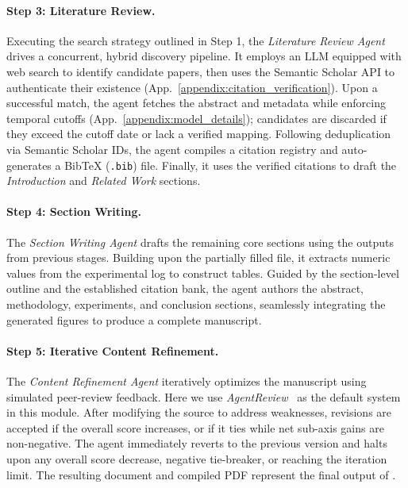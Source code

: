 \paragraph{Step 3: Literature Review.} Executing the search strategy outlined in Step 1, the \textit{Literature Review Agent} drives a concurrent, hybrid discovery pipeline. It employs an LLM equipped with web search to identify candidate papers, then uses the Semantic Scholar API to authenticate their existence (App.~\ref{appendix:citation_verification}). Upon a successful match, the agent fetches the abstract and metadata while enforcing temporal cutoffs (App.~\ref{appendix:model_details}); candidates are discarded if they exceed the cutoff date or lack a verified mapping. Following deduplication via Semantic Scholar IDs, the agent compiles a citation registry and auto-generates a BibTeX (\texttt{.bib}) file. Finally, it uses the verified citations to draft the \textit{Introduction} and \textit{Related Work} sections.

\paragraph{Step 4: Section Writing.} The \textit{Section Writing Agent} drafts the remaining core sections using the outputs from previous stages. Building upon the partially filled \mylatex{} file, it extracts numeric values from the experimental log to construct tables. Guided by the section-level outline and the established citation bank, the agent authors the abstract, methodology, experiments, and conclusion sections, seamlessly integrating the generated figures to produce a complete \mylatex{} manuscript.

\paragraph{Step 5: Iterative Content Refinement.} The \textit{Content Refinement Agent} iteratively optimizes the manuscript using simulated peer-review feedback. Here we use \textit{AgentReview}~\citep{jin2024agentreview} as the default system in this module. After modifying the \mylatex{} source to address weaknesses, revisions are accepted if the overall score increases, or if it ties while net sub-axis gains are non-negative. The agent immediately reverts to the previous version and halts upon any overall score decrease, negative tie-breaker, or reaching the iteration limit. The resulting \mylatex{} document and compiled PDF represent the final output of \ourmethod.

